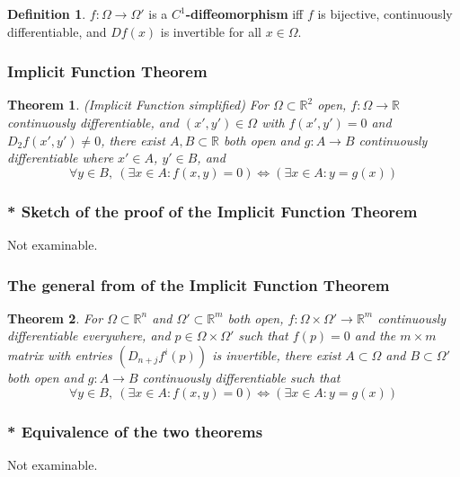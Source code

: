 \documentclass[12pt]{article}
\newtheorem{thm}{Theorem}[section]
\theoremstyle{definition}
\newtheorem*{defn*}{Definition}
\newcommand{\R}{\mathbb{R}}
\begin{document}
\begin{defn*}
  $f : \Omega \to \Omega'$ is a \textbf{$C^1$-diffeomorphism} iff $f$ is bijective, continuously differentiable, and $Df(x)$ is invertible for all $x \in \Omega$.
\end{defn*}

\subsubsection{Implicit Function Theorem}

\begin{thm}
  (Implicit Function simplified)
  For $\Omega \subset \R^2$ open, $f : \Omega \to \R$ continuously differentiable, and $(x', y') \in \Omega$ with $f(x', y') = 0$ and $D_2f(x', y') \neq 0$, there exist $A, B \subset \R$ both open and $g : A \to B$ continuously differentiable where $x' \in A$, $y' \in B$, and
  $$\forall y \in B,\ (\exists x \in A : f(x, y) = 0) \iff (\exists x \in A : y = g(x))$$
\end{thm}

\subsubsection{* Sketch of the proof of the Implicit Function Theorem}

Not examinable.

\subsubsection{The general from of the Implicit Function Theorem}

\begin{thm}
  For $\Omega \subset \R^n$ and $\Omega' \subset \R^m$ both open, $f : \Omega \times \Omega' \to \R^m$ continuously differentiable everywhere, and $p \in \Omega \times \Omega'$ such that $f(p) = 0$ and the $m \times m$ matrix with entries $(D_{n + j}f^i(p))$ is invertible, there exist $A \subset \Omega$ and $B \subset \Omega'$ both open and $g : A \to B$ continuously differentiable such that
  $$\forall y \in B,\ (\exists x \in A : f(x, y) = 0) \iff (\exists x \in A : y = g(x))$$
\end{thm}

\subsubsection{* Equivalence of the two theorems}

Not examinable.
\end{document}
